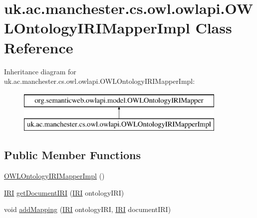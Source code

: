 \hypertarget{classuk_1_1ac_1_1manchester_1_1cs_1_1owl_1_1owlapi_1_1_o_w_l_ontology_i_r_i_mapper_impl}{\section{uk.\-ac.\-manchester.\-cs.\-owl.\-owlapi.\-O\-W\-L\-Ontology\-I\-R\-I\-Mapper\-Impl Class Reference}
\label{classuk_1_1ac_1_1manchester_1_1cs_1_1owl_1_1owlapi_1_1_o_w_l_ontology_i_r_i_mapper_impl}
}
Inheritance diagram for uk.\-ac.\-manchester.\-cs.\-owl.\-owlapi.\-O\-W\-L\-Ontology\-I\-R\-I\-Mapper\-Impl\-:\begin{figure}[H]
\begin{center}
\leavevmode
\includegraphics[height=2.000000cm]{classuk_1_1ac_1_1manchester_1_1cs_1_1owl_1_1owlapi_1_1_o_w_l_ontology_i_r_i_mapper_impl}
\end{center}
\end{figure}
\subsection*{Public Member Functions}
\begin{DoxyCompactItemize}
\item 
\hyperlink{classuk_1_1ac_1_1manchester_1_1cs_1_1owl_1_1owlapi_1_1_o_w_l_ontology_i_r_i_mapper_impl_acbeb233f0d80b2e537f66f6245f9a555}{O\-W\-L\-Ontology\-I\-R\-I\-Mapper\-Impl} ()
\item 
\hyperlink{classorg_1_1semanticweb_1_1owlapi_1_1model_1_1_i_r_i}{I\-R\-I} \hyperlink{classuk_1_1ac_1_1manchester_1_1cs_1_1owl_1_1owlapi_1_1_o_w_l_ontology_i_r_i_mapper_impl_a9388a7adb6839b635016b6f2fe9f0541}{get\-Document\-I\-R\-I} (\hyperlink{classorg_1_1semanticweb_1_1owlapi_1_1model_1_1_i_r_i}{I\-R\-I} ontology\-I\-R\-I)
\item 
void \hyperlink{classuk_1_1ac_1_1manchester_1_1cs_1_1owl_1_1owlapi_1_1_o_w_l_ontology_i_r_i_mapper_impl_ab31d93ec12652304e796cfad125483c6}{add\-Mapping} (\hyperlink{classorg_1_1semanticweb_1_1owlapi_1_1model_1_1_i_r_i}{I\-R\-I} ontology\-I\-R\-I, \hyperlink{classorg_1_1semanticweb_1_1owlapi_1_1model_1_1_i_r_i}{I\-R\-I} document\-I\-R\-I)
\end{DoxyCompactItemize}

